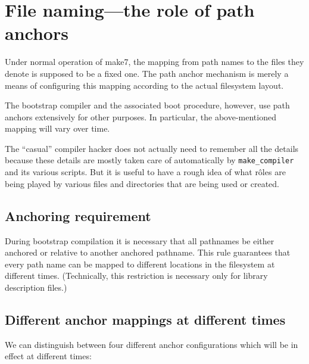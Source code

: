 
\section{File naming---the role of path anchors}

Under normal operation of make7, the mapping from path names to the files
they denote is supposed to be a fixed one.  The path anchor mechanism
is merely a means of configuring this mapping according to the
actual filesystem layout.

The bootstrap compiler and the associated boot procedure, however, use
path anchors extensively for other purposes.  In particular, the
above-mentioned mapping will vary over time.

The ``casual'' compiler hacker does not actually need to remember all
the details because these details are mostly taken care of
automatically by {\tt make_compiler} and its various scripts.
But it is useful to have a rough idea of
what r\^{o}les are being played by various files and directories that
are being used or created.

\subsection{Anchoring requirement}

During bootstrap compilation it is necessary that all pathnames be
either anchored or relative to another anchored pathname.  This rule
guarantees that every path name can be mapped to different locations
in the filesystem at different times.  (Technically, this restriction
is necessary only for library description files.)

\subsection{Different anchor mappings at different times}

We can distinguish between four different anchor configurations which
will be in effect at different times:


